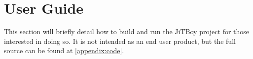 \section{User Guide}

This section will briefly detail how to build and run the JiTBoy project for those interested in doing so. It is not intended as an end user product, but the full source can be found at \autoref{appendix:code}.


